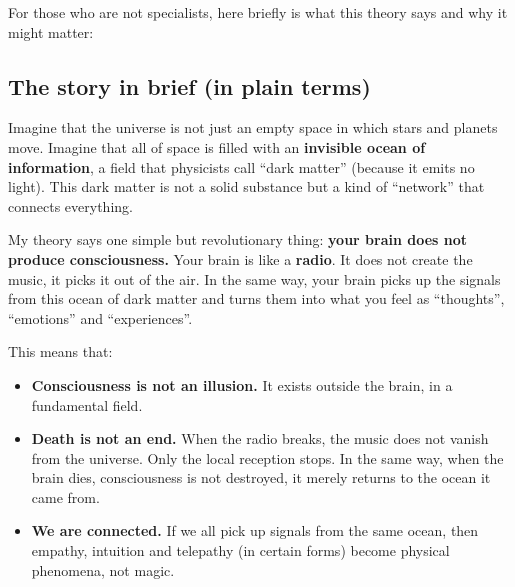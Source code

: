 \documentclass[11pt,a4paper]{article}
\begin{document}
For those who are not specialists, here briefly is what this theory says and why it might matter:

\subsection{The story in brief (in plain terms)}
Imagine that the universe is not just an empty space in which stars and planets move. Imagine that all of space is filled with an \textbf{invisible ocean of information}, a field that physicists call ``dark matter'' (because it emits no light). This dark matter is not a solid substance but a kind of ``network'' that connects everything.

My theory says one simple but revolutionary thing: \textbf{your brain does not produce consciousness.} Your brain is like a \textbf{radio}. It does not create the music, it picks it out of the air. In the same way, your brain picks up the signals from this ocean of dark matter and turns them into what you feel as ``thoughts'', ``emotions'' and ``experiences''.

This means that:
\begin{itemize}
    \item \textbf{Consciousness is not an illusion.} It exists outside the brain, in a fundamental field.
    \item \textbf{Death is not an end.} When the radio breaks, the music does not vanish from the universe. Only the local reception stops. In the same way, when the brain dies, consciousness is not destroyed, it merely returns to the ocean it came from.
    \item \textbf{We are connected.} If we all pick up signals from the same ocean, then empathy, intuition and telepathy (in certain forms) become physical phenomena, not magic.
\end{itemize}
\end{document}

